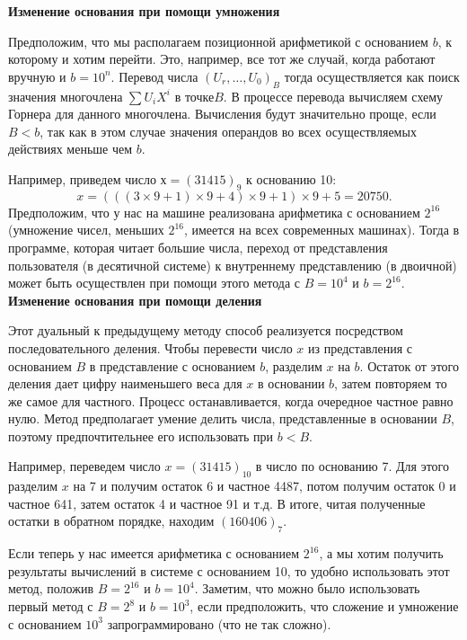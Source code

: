 \documentclass{mai_book}
\begin{document}
\textbf{Изменение основания при помощи умножения}
\par
 Предположим, что мы располагаем позиционной арифметикой с 
основанием $b$, к которому и хотим перейти. Это, например, все тот же
случай, когда работают вручную и $b = 10^n$. Перевод числа $(U_{r},\ldots,U_{0})_{B}$ тогда осуществляется как поиск значения многочлена $\sum U_{i}X^{i}$ в точке$B$. В процессе перевода вычисляем схему Горнера для данного 
многочлена. Вычисления будут значительно проще, если $B < b$, так как
в этом случае значения операндов во всех осуществляемых действиях
меньше чем $b$.\par
Например, приведем число $х = (31415)_9$ к основанию 10:
$$x = (((3 \times 9+1)\times9 + 4)\times9+1)\times9 + 5 = 20750.$$
Предположим, что у нас на машине реализована арифметика с 
основанием $2^{16}$ (умножение чисел, меньших $2^{16}$, имеется на всех современных машинах). Тогда в программе, которая читает большие числа, переход от представления пользователя (в десятичной системе) к внутреннему представлению (в двоичной) может быть осуществлен при помощи этого метода с $B = 10^{4}$ и $b = 2^{16}$. \\

\textbf{Изменение основания при помощи деления} \par
Этот дуальный к предыдущему методу способ реализуется 
посредством последовательного деления. Чтобы перевести число $x$ из
представления с основанием $B$ в представление с основанием $b$, 
разделим $x$ на $b$. Остаток от этого деления дает цифру наименьшего веса для
$x$ в основании $b$, затем повторяем то же самое для частного. Процесс
останавливается, когда очередное частное равно нулю. Метод 
предполагает умение делить числа, представленные в основании $B$, поэтому предпочтительнее его использовать при $b < B$.\par
Например, переведем число $x = (31415)_{10}$ в число по основанию 7.
Для этого разделим $x$ на 7 и получим остаток 6 и частное 4487, 
потом получим остаток 0 и частное 641, затем остаток 4 и частное 91
и т.д. В итоге, читая полученные остатки в обратном порядке, 
находим $(160406)_{7}$.\par
Если теперь у нас имеется арифметика с основанием $2^16$, а мы 
хотим получить результаты вычислений в системе с основанием 10, то
удобно использовать этот метод, положив $B = 2^{16}$ и $b = 10^{4}$. Заметим,
что можно было использовать первый метод с $B = 2^{8}$ и $b=10^{3}$, если
предположить, что сложение и умножение с основанием $10^{3}$ 
запрограммировано (что не так сложно). %
\end{document}
